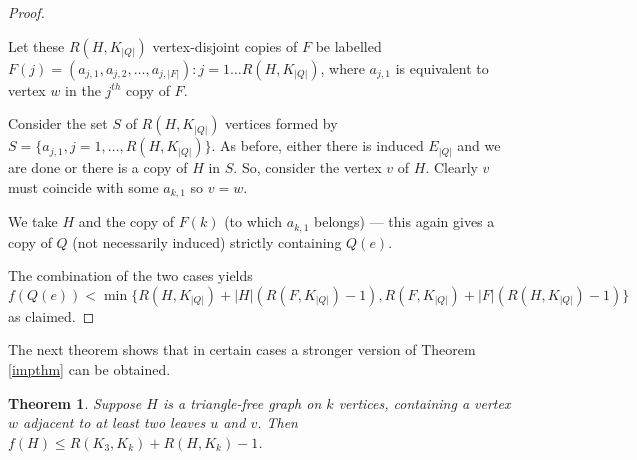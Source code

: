 \documentclass[a4paper,12pt]{article}
\newtheorem{theorem}{Theorem}[section]
\begin{document}
\begin{proof}
\begin{enumerate}
{Let these $R(H , K_{|Q|})$ vertex-disjoint copies of $F$ be labelled  $F(j) = (a_{j,1}, a_{j,2},\ldots,a_{j,|F|}): j = 1 \dots R(H , K_{|Q|})$, where $a­_ {­­j,1}$ is equivalent to vertex $w$ in the $j^{th}$ copy of $F$.

Consider the set $S$  of $R(H , K_{|Q|})$  vertices formed by $S = \{ a_{j,1} , j = 1,\ldots, R(H , K_{|Q|})   \}$.  As before, either there is induced $E_{|Q|}$ and we are done or there  is a copy of $H$ in $S$.  So, consider  the vertex $v$ of $H$.  Clearly $v$ must coincide with some $a_{k,1}$ so $v = w$.

We take $H$ and the copy of $F(k)$ (to which $a_{k,1}$ belongs) --- this again gives a copy of $Q$ (not necessarily induced) strictly containing $Q(e)$. }
\end{enumerate}
The combination of the two cases yields
 \[f(Q(e))  <  \min \{ R(H,K_{|Q|} ) +  |H|(R(F,K_{|Q|}) - 1) , R(F,K_{|Q|} ) +  |F|( R(H,K_{|Q|} )- 1)  \}\]
as claimed.
\end{proof}
 
 The next theorem shows that in certain cases a stronger version of Theorem \ref{impthm} can be obtained.

\begin{theorem}

Suppose $H$ is a triangle-free graph on $k$ vertices,  containing a vertex $w$ adjacent to at least two leaves $u$ and $v$.  Then $f(H)  \leq R(K_3,K_k) +R(H,K_k)  - 1 $.
\end{theorem}
 
\end{document}
